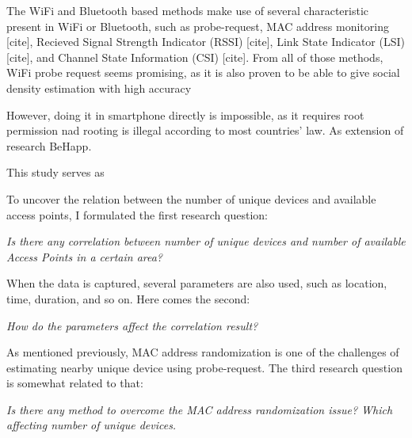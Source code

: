 The WiFi and Bluetooth based methods make use of several characteristic present in WiFi or Bluetooth, such as probe-request, MAC address monitoring [cite], Recieved Signal Strength Indicator (RSSI) [cite], Link State Indicator (LSI) [cite], and Channel State Information (CSI) [cite]. From all of those methods, WiFi probe request seems promising, as it is also proven to be able to give social density estimation with high accuracy~\cite{}

However, doing it in smartphone directly is impossible, as it requires root permission nad rooting is illegal according to most countries' law. As extension of research BeHapp.


This study serves as 

To uncover the relation between the number of unique devices and available access points, I formulated the first research question:
\begin{displayquote}\textit{
Is there any correlation between number of unique devices and number of available Access Points in a certain area?}
\end{displayquote}

When the data is captured, several parameters are also used, such as location, time, duration, and so on. Here comes the second:
\begin{displayquote}\textit{
How do the parameters affect the correlation result?}
\end{displayquote}

As mentioned previously, MAC address randomization is one of the challenges of estimating nearby unique device using probe-request. The third research question is somewhat related to that:
\begin{displayquote}\textit{
Is there any method to overcome the MAC address randomization issue? Which affecting number of unique devices.}
\end{displayquote}

